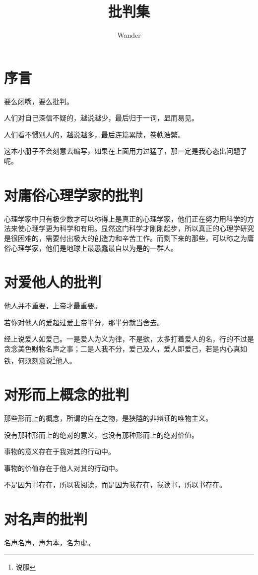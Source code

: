 \documentclass[12pt,oneside]{book}
\title{批判集}
\author{Wander}
\begin{document}
\makemytitle
{}

\frontmatter 
{}
\chapter*{序言}
要么闭嘴，要么批判。

人们对自己深信不疑的，越说越少，最后归于一词，显而易见。

人们看不惯别人的，越说越多，最后连篇累牍，卷帙浩繁。

这本小册子不会刻意去编写，如果在上面用力过猛了，那一定是我心态出问题了呢。


\setcounter{tocdepth}{2}    
\tableofcontents


\mainmatter


\chapter{对庸俗心理学家的批判}
心理学家中只有极少数才可以称得上是真正的心理学家，他们正在努力用科学的方法来使心理学更为科学和有用。显然这门科学才刚刚起步，所以真正的心理学研究是很困难的，需要付出极大的创造力和辛苦工作。而剩下来的那些，可以称之为庸俗心理学家，他们是地球上最愚蠢最自以为是的一群人。



\chapter{对爱他人的批判}
他人并不重要，上帝才最重要。

若你对他人的爱超过爱上帝半分，那半分就当舍去。

经上说爱人如爱己。一是爱人为义为律，不是欲，太多打着爱人的名，行的不过是贪念美色财物名声之事；二是人我不分，爱己及人，爱人即爱己，若是内心真如铁，何须刻意说\footnote{说服}他人。

\chapter{对形而上概念的批判}
那些形而上的概念，所谓的自在之物，是狭隘的非辩证的唯物主义。

没有那种形而上的绝对的意义，也没有那种形而上的绝对价值。

事物的意义存在于我对其的行动中。

事物的价值存在于他人对其的行动中。

不是因为书存在，所以我阅读，而是因为我存在，我读书，所以书存在。




\chapter{对名声的批判}
名声名声，声为本，名为虚。
\end{document}
